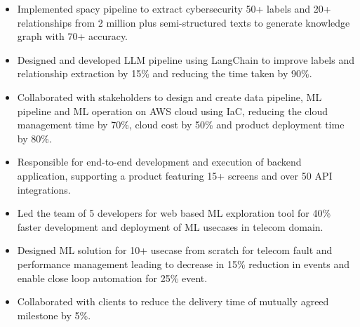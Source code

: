 \documentclass[10pt,a4paper,ragged2e,withhyper]{altacv}
\author{Madhusudan Kumar}
\date{\today}
\title{}
\begin{document}
\makecvheader
\label{sec:org1a7e42d}
\label{sec:org66f6c9c}

\begin{itemize}
\item Implemented spacy pipeline to extract cybersecurity 50+ labels and 20+ relationships from 2 million plus semi-structured texts to generate knowledge graph with 70+ accuracy.
\item Designed and developed LLM pipeline using LangChain to improve labels and relationship extraction by 15\% and reducing the time taken by 90\%.
\item Collaborated with stakeholders to design and create data pipeline, ML pipeline and ML operation on AWS cloud using IaC, reducing the cloud management time by 70\%, cloud cost by 50\% and product deployment time by 80\%.
\item Responsible for end-to-end development and execution of backend application, supporting a product featuring 15+ screens and over 50 API integrations.
\end{itemize}


\begin{itemize}
\item Led the team of 5 developers for web based ML exploration tool for 40\% faster development and deployment of ML usecases in telecom domain.
\item Designed ML solution for 10+ usecase from scratch for telecom fault and performance management leading to decrease in 15\% reduction in events and enable close loop automation for 25\% event.
\item Collaborated with clients to reduce the delivery time of mutually agreed milestone by 5\%.
\end{itemize}
\end{document}
